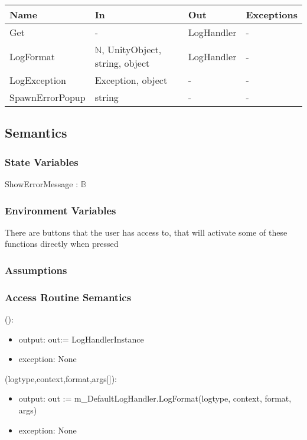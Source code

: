 \documentclass[12pt, titlepage]{article}
\begin{document}
\begin{center}
\begin{tabular}{p{3.2cm} p{4cm} p{4cm} p{2cm}}
\hline
\textbf{Name} & \textbf{In} & \textbf{Out} & \textbf{Exceptions} \\
\hline
Get & - & LogHandler & - \\
LogFormat & $\mathds{N}$, UnityObject, string, object & LogHandler & - \\
LogException & Exception, object & - &-\\
SpawnErrorPopup & string & - & - \\
\hline
\end{tabular}
\end{center}

\subsection{Semantics}

\subsubsection{State Variables}

ShowErrorMessage : $\mathds{B}$

\subsubsection{Environment Variables}

There are buttons that the user has access to, that will activate some of these functions directly when pressed

\subsubsection{Assumptions}

\subsubsection{Access Routine Semantics}

():
\begin{itemize}
\item output: out:= LogHandlerInstance
\item exception: None
\end{itemize}

(logtype,context,format,args[]):
\begin{itemize}
\item output: out := m\_DefaultLogHandler.LogFormat(logtype, context, format, args)
\item exception: None
\end{itemize}
\end{document}
